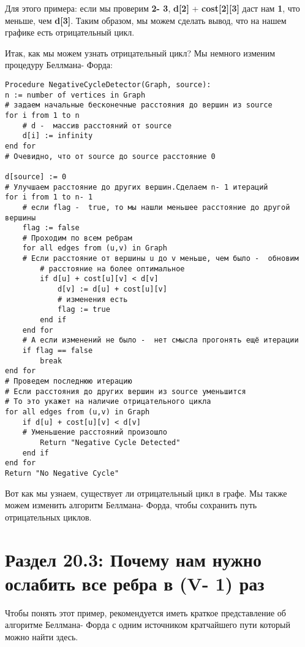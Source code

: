 \vspace{\baselineskip}

Для этого примера: если мы проверим \textbf{2- 3}, \textbf{d[2]} + \textbf{cost[2][3]} даст нам \textbf{1}, что меньше, чем \textbf{d[3]}. Таким образом, мы можем сделать вывод, что на нашем графике есть отрицательный цикл.

\vspace{\baselineskip}

Итак, как мы можем узнать отрицательный цикл? Мы немного изменим процедуру Беллмана- Форда:

\begin{tcolorbox}
\begin{verbatim}
Procedure NegativeCycleDetector(Graph, source):
n := number of vertices in Graph
# задаем начальные бесконечные расстояния до вершин из source
for i from 1 to n
	# d -  массив расстояний от source
	d[i] := infinity
end for
# Очевидно, что от source до source расстояние 0

d[source] := 0
# Улучшаем расстояние до других вершин.Сделаем n- 1 итераций
for i from 1 to n- 1
	# если flag -  true, то мы нашли меньшее расстояние до другой вершины
	flag := false
	# Проходим по всем ребрам
	for all edges from (u,v) in Graph
	# Если расстояние от вершины u до v меньше, чем было -  обновим
		# расстояние на более оптимальное
		if d[u] + cost[u][v] < d[v]
			d[v] := d[u] + cost[u][v]
			# изменения есть
			flag := true
		end if
	end for
	# А если изменений не было -  нет смысла прогонять ещё итерации
	if flag == false
		break
end for
# Проведем последнюю итерацию
# Если расстояния до других вершин из source уменьшится
# То это укажет на наличие отрицательного цикла
for all edges from (u,v) in Graph
	if d[u] + cost[u][v] < d[v]
	# Уменьшение расстояний произошло
		Return "Negative Cycle Detected"
	end if
end for
Return "No Negative Cycle"
\end{verbatim}
\end{tcolorbox}

Вот как мы узнаем, существует ли отрицательный цикл в графе. Мы также можем изменить алгоритм Беллмана- Форда, чтобы сохранить путь отрицательных циклов.

\section*{Раздел 20.3: Почему нам нужно ослабить все ребра в (V- 1) раз}

Чтобы понять этот пример, рекомендуется иметь краткое представление об алгоритме Беллмана- Форда с одним источником кратчайшего пути который можно найти здесь.

